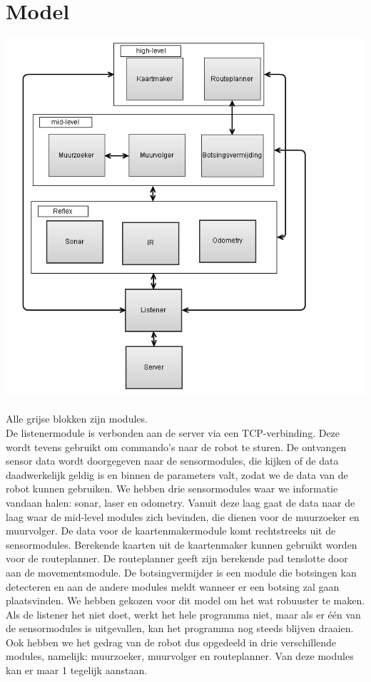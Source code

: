 \documentclass[a4paper,10pt]{article}
\begin{document}
\section{Model}
\includegraphics[scale = 0.5]{flowchart.PNG}\\\\
Alle grijse blokken zijn modules.\\
De listenermodule is verbonden aan de server via een TCP-verbinding. Deze wordt tevens gebruikt om commando's naar de robot te sturen. De ontvangen sensor data wordt doorgegeven naar de sensormodules, die kijken of de data daadwerkelijk geldig is en binnen de parameters valt, zodat we de data van de robot kunnen gebruiken. We hebben drie sensormodules waar we informatie vandaan halen: sonar, laser en odometry. Vanuit deze laag gaat de data naar de laag waar de mid-level modules zich bevinden, die dienen voor de muurzoeker en muurvolger. De data voor de kaartenmakermodule komt rechtstreeks uit de sensormodules. Berekende kaarten uit de kaartenmaker kunnen gebruikt worden voor de routeplanner. De routeplanner geeft zijn berekende pad tenslotte door aan de movementsmodule. De botsingvermijder is een module die botsingen kan detecteren en aan de andere modules meldt wanneer er een botsing zal gaan plaatsvinden.
We hebben gekozen voor dit model om het wat robuuster te maken. Als de listener het niet doet, werkt het hele programma niet, maar als er \'{e}\'{e}n van de sensormodules is uitgevallen, kan het programma
nog steeds blijven draaien. Ook hebben we het gedrag van de robot dus opgedeeld in drie verschillende modules, namelijk: muurzoeker, muurvolger en routeplanner. Van deze modules kan er maar 1 tegelijk aanstaan. 
\end{document}
